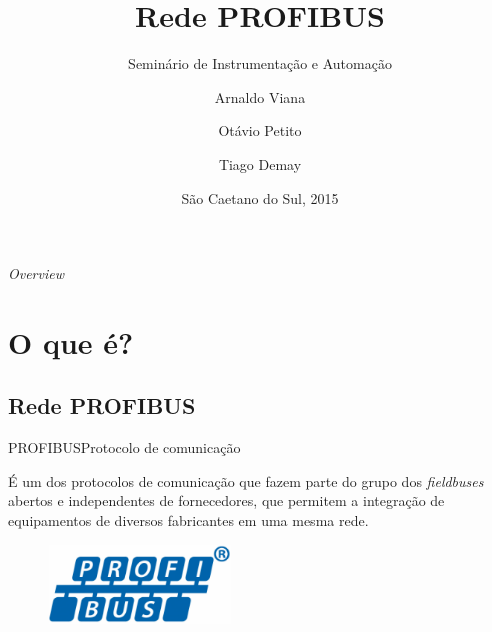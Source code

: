 \documentclass{beamer}
\title[Rede PROFIBUS] %
{Rede PROFIBUS}
\subtitle
{Seminário de Instrumentação e Automação}
\author[Arnaldo Viana, Otávio Petito, Tiago Demay] %
{Arnaldo Viana\inst{1} \and Otávio Petito\inst{2} \and Tiago Demay\inst{3}}
\institute[Escola de Engenharia Mauá] %
{
  \inst{1}%
  RA 09.01746-0\\
  6º Ano - Noturno
  \and
  \inst{2}%
  RA 08.1453-0\\
  6º Ano - Noturno
  \and
  \inst{3}%
  RA 09.02270-8\\
  6º Ano - Noturno
  }
\date[SCS 2015] %
{São Caetano do Sul, 2015}
\begin{document}
\begin{frame}
  \titlepage
\end{frame}

\begin{frame}{\textit{Overview}}
  \tableofcontents
\end{frame}





\section{O que é?}

\subsection{Rede PROFIBUS}

\begin{frame}{PROFIBUS}{Protocolo de comunicação}

  É um dos protocolos de comunicação que fazem parte do grupo dos \textit{fieldbuses} abertos e independentes de fornecedores, que permitem a integração de equipamentos de diversos fabricantes em uma mesma rede.
  
  \begin{figure}
  	\centering
  	\includegraphics[scale=0.8]{figs/profibus.png} 
  \end{figure}
  
\end{frame}
\end{document}
